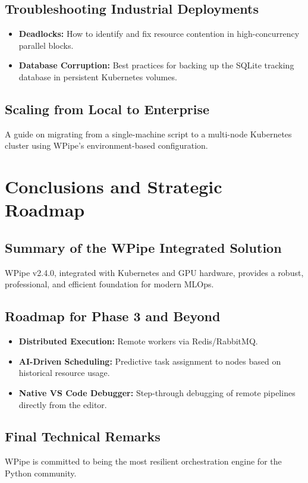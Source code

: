 \documentclass[12pt,a4paper]{report}
\begin{document}
\section{Troubleshooting Industrial Deployments}
\begin{itemize}
    \item \textbf{Deadlocks:} How to identify and fix resource contention in high-concurrency parallel blocks.
    \item \textbf{Database Corruption:} Best practices for backing up the SQLite tracking database in persistent Kubernetes volumes.
\end{itemize}

\cleardoublepage
\section{Scaling from Local to Enterprise}
A guide on migrating from a single-machine script to a multi-node Kubernetes cluster using WPipe's environment-based configuration.

\chapter{Conclusions and Strategic Roadmap}
\cleardoublepage

\section{Summary of the WPipe Integrated Solution}
WPipe v2.4.0, integrated with Kubernetes and GPU hardware, provides a robust, professional, and efficient foundation for modern MLOps.

\section{Roadmap for Phase 3 and Beyond}
\begin{itemize}
    \item \textbf{Distributed Execution:} Remote workers via Redis/RabbitMQ.
    \item \textbf{AI-Driven Scheduling:} Predictive task assignment to nodes based on historical resource usage.
    \item \textbf{Native VS Code Debugger:} Step-through debugging of remote pipelines directly from the editor.
\end{itemize}

\cleardoublepage
\section{Final Technical Remarks}
WPipe is committed to being the most resilient orchestration engine for the Python community.
\end{document}
